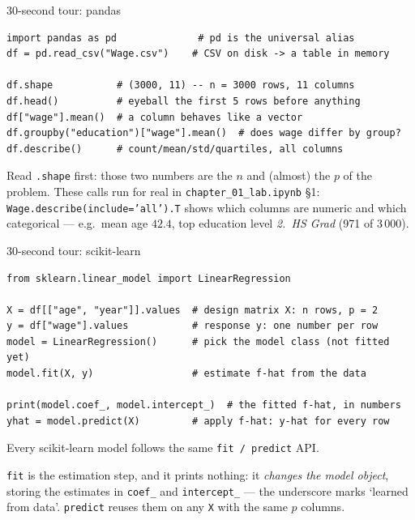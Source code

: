 \documentclass[aspectratio=169,11pt]{beamer}
\begin{document}
\begin{frame}[fragile]{30-second tour: pandas}
  \begin{lstlisting}
import pandas as pd              # pd is the universal alias
df = pd.read_csv("Wage.csv")    # CSV on disk -> a table in memory

df.shape           # (3000, 11) -- n = 3000 rows, 11 columns
df.head()          # eyeball the first 5 rows before anything
df["wage"].mean()  # a column behaves like a vector
df.groupby("education")["wage"].mean()  # does wage differ by group?
df.describe()      # count/mean/std/quartiles, all columns
  \end{lstlisting}
  \begin{labnote}
    Read \texttt{.shape} first: those two numbers are the $n$ and (almost) the $p$ of the problem. These calls run for real in \texttt{chapter\_01\_lab.ipynb} \S1: \texttt{Wage.describe(include='all').T} shows which columns are numeric and which categorical --- e.g.\ mean age $42.4$, top education level \emph{2.\ HS Grad} (971 of $3\,000$).
  \end{labnote}
\end{frame}

\begin{frame}[fragile]{30-second tour: scikit-learn}
  \begin{lstlisting}
from sklearn.linear_model import LinearRegression

X = df[["age", "year"]].values  # design matrix X: n rows, p = 2
y = df["wage"].values           # response y: one number per row
model = LinearRegression()      # pick the model class (not fitted yet)
model.fit(X, y)                 # estimate f-hat from the data

print(model.coef_, model.intercept_)  # the fitted f-hat, in numbers
yhat = model.predict(X)         # apply f-hat: y-hat for every row
  \end{lstlisting}
  Every scikit-learn model follows the same \texttt{fit / predict}
  API.
  \begin{readme}
    \texttt{fit} is the estimation step, and it prints nothing: it
    \emph{changes the model object}, storing the estimates in \texttt{coef\_}
    and \texttt{intercept\_} --- the underscore marks `learned from data'.
    \texttt{predict} reuses them on any \texttt{X} with the same $p$ columns.
  \end{readme}
\end{frame}


\end{document}
